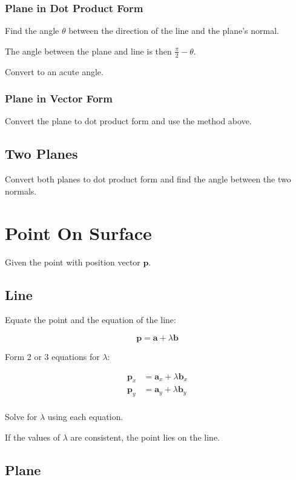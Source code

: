 \documentclass[a4paper,11pt]{article}
\newcommand{\bb}{\boldsymbol}
\begin{document}
\subsubsection{Plane in Dot Product Form}

Find the angle $\theta$ between the direction of the line and the plane's normal.

The angle between the plane and line is then $\frac{\pi}{2} - \theta$.

Convert to an acute angle.


\subsubsection{Plane in Vector Form}

Convert the plane to dot product form and use the method above.


\subsection{Two Planes}

Convert both planes to dot product form and find the angle between the two
normals.



\section{Point On Surface}

Given the point with position vector $\bb{p}$.


\subsection{Line}

Equate the point and the equation of the line:

$$
\bb{p} = \bb{a} + \lambda \bb{b}
$$

Form 2 or 3 equations for $\lambda$:

$$
\begin{aligned}
\bb{p}_x & = \bb{a}_x + \lambda \bb{b}_x \\
\bb{p}_y & = \bb{a}_y + \lambda \bb{b}_y \\
\end{aligned}
$$

Solve for $\lambda$ using each equation.

If the values of $\lambda$ are consistent, the point lies on the line.


\subsection{Plane}
\end{document}
